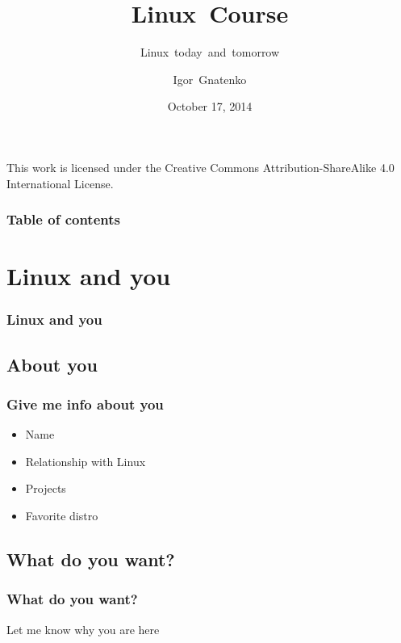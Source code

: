 \documentclass{beamer}
\title{Linux~Course}
\subtitle{Linux~today~and~tomorrow}
\author{Igor~Gnatenko}
\date{October 17, 2014}
\begin{document}
\begin{frame}
\titlepage
\null
\vfill
\begin{flushright}
{\tiny
This work is licensed under the Creative Commons Attribution-ShareAlike 4.0
International License.}
\end{flushright}
\end{frame}

\begin{frame}
\frametitle{Table of contents}
\tableofcontents
\end{frame}

\section{Linux and you}
\begin{frame}
\frametitle<presentation>{Linux and you}
\end{frame}

\subsection{About you}
\begin{frame}
\frametitle{Give me info about you}
\begin{itemize}
  \item Name
  \item Relationship with Linux
  \item Projects
  \item Favorite distro
\end{itemize}
\end{frame}

\subsection{What do you want?}
\begin{frame}
\frametitle{What do you want?}
Let me know why you are here
\end{frame}
\end{document}
